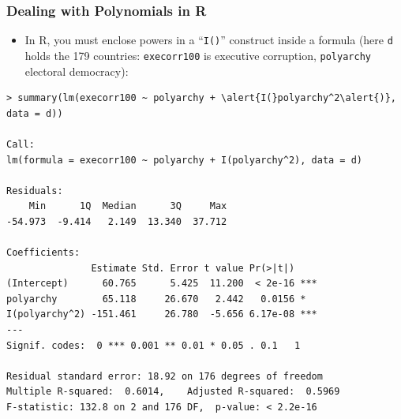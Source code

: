 \documentclass[xcolor=svgnames,9pt,english,aspectratio=169,t]{beamer}
\begin{document}
\begin{frame}[fragile]
\frametitle{Dealing with Polynomials in R}
\begin{itemize}
  \item In R, you must enclose powers in a ``{\tt I()}'' construct inside a formula (here {\tt d} holds the 179 countries: {\tt execorr100} is executive corruption, {\tt polyarchy} electoral democracy):
\end{itemize}
\medskip
{}
\begin{Verbatim}[fontsize=\footnotesize, frame=single, label=R Code, commandchars=\\\{\}]
> summary(lm(execorr100 ~ polyarchy + \alert{I(}polyarchy^2\alert{)}, data = d))

Call:
lm(formula = execorr100 ~ polyarchy + I(polyarchy^2), data = d)

Residuals:
    Min      1Q  Median      3Q     Max
-54.973  -9.414   2.149  13.340  37.712

Coefficients:
               Estimate Std. Error t value Pr(>|t|)
(Intercept)      60.765      5.425  11.200  < 2e-16 ***
polyarchy        65.118     26.670   2.442   0.0156 *
I(polyarchy^2) -151.461     26.780  -5.656 6.17e-08 ***
---
Signif. codes:  0 *** 0.001 ** 0.01 * 0.05 . 0.1   1

Residual standard error: 18.92 on 176 degrees of freedom
Multiple R-squared:  0.6014,	Adjusted R-squared:  0.5969
F-statistic: 132.8 on 2 and 176 DF,  p-value: < 2.2e-16
\end{Verbatim}
\end{frame}
\end{document}
